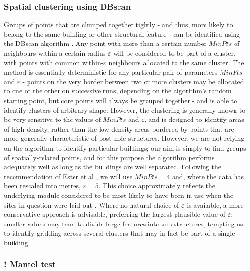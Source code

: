 \documentclass[../../ArchStats.tex]{subfiles}
\begin{document}
\subsubsection{Spatial clustering using DBscan}
\label{sec:DBscan}
Groups of points that are clumped together tightly - and thus, more likely to belong to the same building or other structural feature - can be identified using the DBscan algorithm \cite{Ester1996}. Any point with more than a certain number $MinPts$ of neighbours within a certain radius $\varepsilon$ will be considered to be part of a cluster, with points with common within-$\varepsilon$ neighbours allocated to the same cluster. The method is essentially deterministic for any particular pair of parameters $MinPts$ and $\varepsilon$ - points on the very border between two or more clusters may be allocated to one or the other on successive runs, depending on the algorithm's random starting point, but core points will always be grouped together - and is able to identify clusters of arbitrary shape. However, the clustering is generally known to be very sensitive to the values of $MinPts$ and $\varepsilon$, and is designed to identify areas of high density, rather than the low-density areas bordered by points that are more generally characteristic of post-hole structures. However, we are not relying on the algorithm to identify particular buildings; our aim is simply to find groups of spatially-related points, and for this purpose the algorithm performs adequately well as long as the buildings are well separated. Following the recommendation of Ester et al \cite{Ester1996}, we will use $MinPts = 4$ and, where the data has been rescaled into metres, $\varepsilon = 5$. This choice approximately reflects the underlying module considered to be most likely to have been in use when the sites in question were laid out  \cite{Blair2013}. Where no natural choice of $\varepsilon$ is available, a more conservative approach is advisable, preferring the largest plausible value of $\varepsilon$; smaller values may tend to divide large features into sub-structures, tempting us to identify gridding across several clusters that may in fact be part of a single building.

\subsubsection{! Mantel test}
\end{document}
